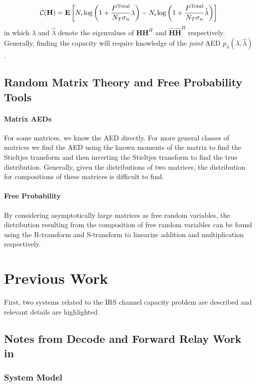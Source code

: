 \documentclass[12pt,a4paper]{report}
\begin{document}
\begin{enumerate}
\begin{gather}\label{secrecy_capacity}
\mathcal{C{}}{(\mathbf{H})} = \mathop{\bf E{}}\left[N_r \text{log{}}\left(1+\frac{P^{\text{Total}}}{N_T \sigma_n}\lambda \right) -
N_e \text{log{}}\left(1+\frac{P^{\text{Total}}}{N_T \sigma_n}\hat{\lambda} \right) \right]
\end{gather}
in which $\lambda$ and $\hat{\lambda}$ denote the eigenvalues of $\mathbf{H}\mathbf{H}^H$ and $\hat{\mathbf{H}}\hat{\mathbf{H}}^H$ respectively. Generally, finding the capacity will require knowledge of the \emph{joint} AED $p_{\lambda}(\lambda,\hat{\lambda})$.

\end{enumerate}
\section{Random Matrix Theory and Free Probability Tools}

\subsubsection{Matrix AEDs}
For some matrices, we know the AED directly. For more general classes of matrices we find the AED using the known moments of the matrix to find the Stieltjes transform and then inverting the Stieltjes transform to find the true distribution. Generally, given the distributions of two matrices, the distribution for compositions of these matrices is difficult to find. 

\subsubsection{Free Probability}
By considering asymptotically large matrices as free random variables, the distribution resulting from the composition of free random variables can be found using the R-transform and S-transform to linearize addition and multiplication respectively.

\chapter{Previous Work}
First, two systems related to the IRS channel capacity problem are described and relevant details are highlighted. 
\section{Notes from Decode and Forward Relay Work in \cite{hadley2019capacity}}\label{relay}
\subsection{System Model}
\end{document}
